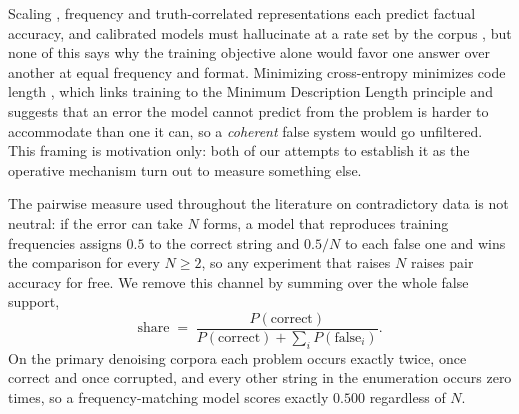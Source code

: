 \documentclass{article}
\begin{document}
Scaling \citep{kadavath2022language}, frequency \citep{kandpal2023large} and truth-correlated representations \citep{marks2024geometry} each predict factual accuracy, and calibrated models must hallucinate at a rate set by the corpus \citep{kalai2024calibrated}, but none of this says why the training objective alone would favor one answer over another at equal frequency and format. Minimizing cross-entropy minimizes code length \citep{shannon1948mathematical,deletang2024language}, which links training to the Minimum Description Length principle \citep{rissanen1978modeling,grunwald2007minimum} and suggests that an error the model cannot predict from the problem is harder to accommodate than one it can, so a \emph{coherent} false system would go unfiltered. This framing is motivation only: both of our attempts to establish it as the operative mechanism turn out to measure something else.

The pairwise measure used throughout the literature on contradictory data is not neutral: if the error can take $N$ forms, a model that reproduces training frequencies assigns $0.5$ to the correct string and $0.5/N$ to each false one and wins the comparison for every $N \geq 2$, so any experiment that raises $N$ raises pair accuracy for free. We remove this channel by summing over the whole false support,
\[
\text{share} \;=\; \frac{P(\text{correct})}{P(\text{correct}) + \sum_i P(\text{false}_i)}.
\]
On the primary denoising corpora each problem occurs exactly twice, once correct and once corrupted, and every other string in the enumeration occurs zero times, so a frequency-matching model scores exactly $0.500$ regardless of $N$.
\end{document}
